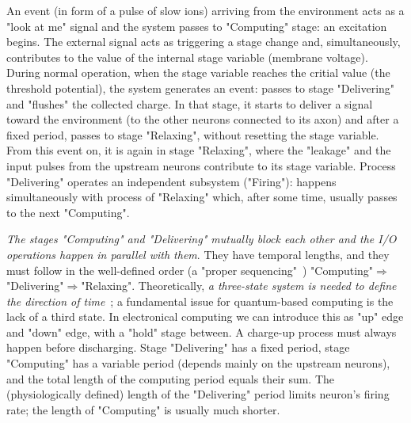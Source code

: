 \fi


\ifx\magyar\undefined

An event (in form of a pulse of slow ions) arriving from the environment acts as a "look at me" signal
and the system passes to "Computing" stage: an excitation begins.
The external signal
acts as triggering a stage change and, simultaneously, contributes to the value of the internal stage variable (membrane voltage).
During normal operation, when the stage variable reaches the critial value (the threshold potential),
the system generates an event: passes to stage "Delivering" and "flushes" the collected charge.
In that stage, it starts to deliver a signal toward the environment
(to  the other neurons connected to its axon) and after a fixed period, passes to stage "Relaxing",
without resetting the stage variable. From this event on, it is again in stage
"Relaxing", where the "leakage" and the input pulses from the upstream neurons contribute to its
stage variable. Process "Delivering" operates an independent subsystem ("Firing"): happens simultaneously with 
process of "Relaxing" which, after some time, usually passes to the next "Computing".

\textit{The stages "Computing" and "Delivering" mutually block 
each other and the I/O operations happen in parallel with them}. They have temporal lengths, and they must follow in the well-defined order (a "proper sequencing"~\cite{EDVACreport1945,VeghRevisingClassicComputing:2021}) "Computing"$\Rightarrow$ "Delivering"$\Rightarrow$"Relaxing". Theoretically, \textit{a three-state system is needed to define the direction of time}~\cite{ThreeStateUnidirectional:2004}; a fundamental issue for quantum-based computing is the lack of a third state. In electronical computing we can introduce this as "up" edge and "down" edge, with a "hold" stage between.  A charge-up process must always happen before discharging. Stage "Delivering" has a fixed period, stage "Computing" has a variable period (depends mainly on the upstream neurons), and the total length of the computing period equals their sum. The (physiologically defined) length of the "Delivering" period limits neuron's firing rate; the length of "Computing" is usually much shorter.

\else

